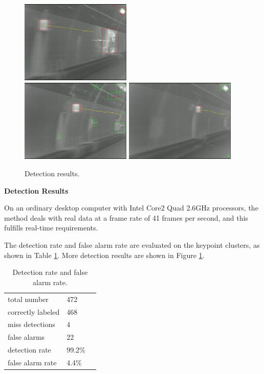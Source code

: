 \begin{figure}
{}
{
\includegraphics[width=0.47\textwidth,bb=0 0 640 480]{02veriTrjimg00046.jpg}
}\\
{
\includegraphics[width=0.47\textwidth,bb=0 0 640 480]{00veriTrjimg00032.jpg}
}
{
\includegraphics[width=0.47\textwidth,bb=0 0 640 480]{06veriTrjimg00032.jpg}
}

\caption[Detection results]{Detection results.}
\label{fig:sixs}
\end{figure}

\textbf{Detection Results}

On an ordinary desktop computer with Intel Core2 Quad 2.6GHz processors, the method deals with real data at a frame rate of 41 frames per second, and this fulfills real-time requirements.


The detection rate and false alarm rate are evaluated on the keypoint clusters, as shown in Table \ref{tb:tb2}.
More detection results are shown in Figure \ref{fig:sixs}.
\begin{table}[h]
\centering
\begin{tabular}{lll}
     \hline
     \hline
    total number &	472  \\
    correctly labeled &	468   \\
    miss detections &	4 &	  \\
    false alarms &	22    \\
    detection rate &	99.2\% &	  \\
    false alarm rate &	4.4\% &	   \\
   \hline
\end{tabular}
\caption{Detection rate and false alarm rate.}\label{tb:tb2}
\end{table}

